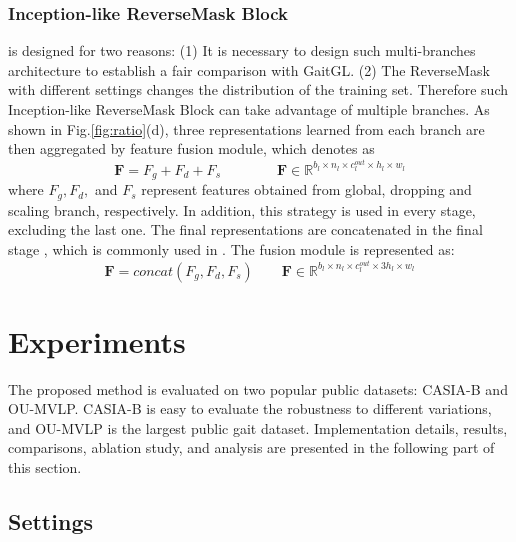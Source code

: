 \documentclass[runningheads]{llncs}
\begin{document}
\subsubsection{Inception-like ReverseMask Block} is designed for two reasons: (1) It is necessary to design such multi-branches architecture to establish a fair comparison with GaitGL. (2) The ReverseMask with different settings changes the distribution of the training set. Therefore such Inception-like ReverseMask Block can take advantage of multiple branches.  As shown in Fig.\ref{fig:ratio}(d), three representations learned from each branch are then aggregated by feature fusion module, which denotes as
    \begin{equation}
    \label{eq:fusion}
      \textbf{F} = {F_g + F_d + F_s} \qquad \qquad  \textbf{F} \in \mathbb{R}^{ b_l \times n_l \times c^{out}_{l} \times h_l \times w_l }
    \end{equation}
where $F_g, F_d,$ and $F_s$ represent features obtained from global, dropping and scaling branch, respectively. In addition, this strategy is used in every stage, excluding the last one. The final representations are concatenated in the final stage , which is commonly used in \cite{gaitgl,cstl,gln}. The fusion module is represented as:
    \begin{equation}
    \label{eq:fusion2}
      \textbf{F} = concat(F_g, F_d, F_s) \qquad \textbf{F} \in \mathbb{R}^{ b_l \times n_l \times c^{out}_{l} \times 3h_l \times w_l }
    \end{equation}
    



\section{Experiments}
The proposed method is evaluated on two popular public datasets: CASIA-B and OU-MVLP. CASIA-B is easy to evaluate the robustness to different variations, and OU-MVLP is the largest public gait dataset. Implementation details, results, comparisons, ablation study, and analysis are presented in the following part of this section. 



\subsection{Settings}
\end{document}
